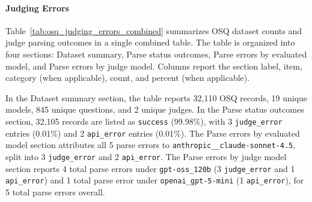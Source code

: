 \paragraph{Judging Errors}
Table~\ref{tab:osq_judging_errors_combined} summarizes OSQ dataset counts and judge parsing outcomes in a single combined table. The table is organized into four sections: Dataset summary, Parse status outcomes, Parse errors by evaluated model, and Parse errors by judge model. Columns report the section label, item, category (when applicable), count, and percent (when applicable).

In the Dataset summary section, the table reports 32{,}110 OSQ records, 19 unique models, 845 unique questions, and 2 unique judges. In the Parse status outcomes section, 32{,}105 records are listed as \texttt{success} (99.98\%), with 3 \texttt{judge\_error} entries (0.01\%) and 2 \texttt{api\_error} entries (0.01\%). The Parse errors by evaluated model section attributes all 5 parse errors to \texttt{anthropic\_\_claude-sonnet-4.5}, split into 3 \texttt{judge\_error} and 2 \texttt{api\_error}. The Parse errors by judge model section reports 4 total parse errors under \texttt{gpt-oss\_120b} (3 \texttt{judge\_error} and 1 \texttt{api\_error}) and 1 total parse error under \texttt{openai\_gpt-5-mini} (1 \texttt{api\_error}), for 5 total parse errors overall.

